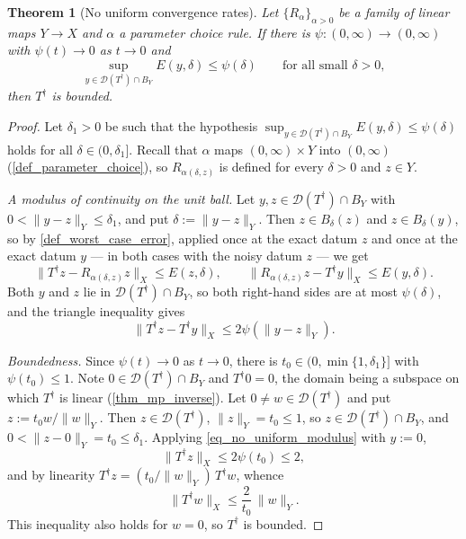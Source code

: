 \documentclass[a4paper]{report}
\theoremstyle{plain}
\newtheorem{theorem}{Theorem}[chapter]
\theoremstyle{definition}
\theoremstyle{remark}
\newcommand{\Dom}{\mathcal{D}}
\newcommand{\dg}{^{\dagger}}
\begin{document}
\begin{theorem}[No uniform convergence rates]
  \label{thm_no_uniform_rates}
  Let $\{R_{\alpha}\}_{\alpha>0}$ be a family of linear maps $Y \to X$ and $\alpha$ a
  parameter choice rule.  If there is
  $\psi \colon (0,\infty) \to (0,\infty)$ with $\psi(t) \to 0$ as $t \to 0$ and
  \[
    \sup_{y \in \Dom(T\dg) \cap B_Y} E(y,\delta) \le \psi(\delta)
    \qquad \text{for all small } \delta > 0,
  \]
  then $T\dg$ is bounded.
\end{theorem}

\begin{proof}
  Let $\delta_1 > 0$ be such that the hypothesis
  $\sup_{y \in \Dom(T\dg) \cap B_Y}E(y,\delta) \le \psi(\delta)$ holds for all
  $\delta \in (0,\delta_1]$.  Recall that $\alpha$ maps $(0,\infty) \times Y$ into
  $(0,\infty)$ (\cref{def_parameter_choice}), so $R_{\alpha(\delta,z)}$ is defined for
  every $\delta > 0$ and $z \in Y$.

  \emph{A modulus of continuity on the unit ball.}  Let $y, z \in \Dom(T\dg) \cap B_Y$
  with $0 < \|y - z\|_Y \le \delta_1$, and put $\delta := \|y - z\|_Y$.  Then
  $z \in B_{\delta}(z)$ and $z \in B_{\delta}(y)$, so by \cref{def_worst_case_error},
  applied once at the exact datum $z$ and once at the exact datum $y$ --- in both cases
  with the noisy datum $z$ --- we get
  \[
    \|T\dg z - R_{\alpha(\delta,z)}z\|_X \le E(z,\delta), \qquad
    \|R_{\alpha(\delta,z)}z - T\dg y\|_X \le E(y,\delta) .
  \]
  Both $y$ and $z$ lie in $\Dom(T\dg) \cap B_Y$, so both right-hand sides are at most
  $\psi(\delta)$, and the triangle inequality gives
  \begin{equation}\label{eq_no_uniform_modulus}
    \|T\dg z - T\dg y\|_X \le 2\psi(\|y - z\|_Y) .
  \end{equation}

  \emph{Boundedness.}  Since $\psi(t) \to 0$ as $t \to 0$, there is
  $t_0 \in (0, \min\{1,\delta_1\}]$ with $\psi(t_0) \le 1$.  Note
  $0 \in \Dom(T\dg) \cap B_Y$ and $T\dg 0 = 0$, the domain being a subspace on which
  $T\dg$ is linear (\cref{thm_mp_inverse}).  Let $0 \ne w \in \Dom(T\dg)$ and put
  $z := t_0 w/\|w\|_Y$.  Then $z \in \Dom(T\dg)$, $\|z\|_Y = t_0 \le 1$, so
  $z \in \Dom(T\dg) \cap B_Y$, and $0 < \|z - 0\|_Y = t_0 \le \delta_1$.  Applying
  \eqref{eq_no_uniform_modulus} with $y := 0$,
  \[
    \|T\dg z\|_X \le 2\psi(t_0) \le 2 ,
  \]
  and by linearity $T\dg z = (t_0/\|w\|_Y)\,T\dg w$, whence
  \[
    \|T\dg w\|_X \le \frac{2}{t_0}\,\|w\|_Y .
  \]
  This inequality also holds for $w = 0$, so $T\dg$ is bounded.
\end{proof}
\end{document}

